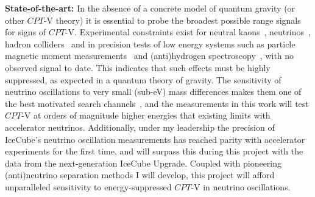 \documentclass[a4paper,11pt]{article}
\begin{document}
\noindent \textbf{State-of-the-art:} In the absence of a concrete model of quantum gravity (or other $CPT$-V theory) it is essential to probe the broadest possible range signals~\cite{hep-ph/9809542} for signs of $CPT$-V. Experimental constraints exist for neutral kaons~\cite{Ellis:1999xh, Ambrosino:2006ek, Abouzaid:2010ny, Babusci:2013gda, Schubert:2014ska}, neutrinos~\cite{Adamson:2013whj, Ohlsson:2014cha}, hadron colliders~\cite{Aad:2013eva, vanTilburg:2016awx} and in precision tests of low energy systems such as particle magnetic moment measurements~\cite{Bluhm:1997ci, Bennett:2007aa} and (anti)hydrogen spectroscopy~\cite{Kostelecky:2015nma}, with no observed signal to date. This indicates that such effects must be highly suppressed, as expected in a quantum theory of gravity. The sensitivity of neutrino oscillations to very small (sub-eV) mass differences makes them one of the best motivated search channels~\cite{PhysRevD.99.075022}, and the measurements in this work will test $CPT$-V at orders of magnitude higher energies that existing limits with accelerator neutrinos. Additionally, under my leadership the precision of IceCube's neutrino oscillation measurements has reached parity with accelerator experiments for the first time, and will surpass this during this project with the data from the next-generation IceCube Upgrade. Coupled with pioneering (anti)neutrino separation methods I will develop, this project will afford unparalleled sensitivity to energy-suppressed $CPT$-V in neutrino oscillations. \\


\end{document}
